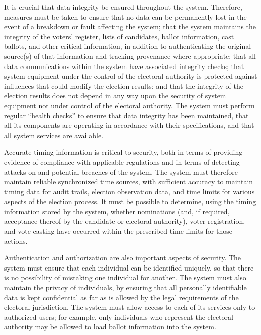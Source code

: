 It is crucial that data integrity be ensured throughout the
system. Therefore, measures must be taken to ensure that no data can
be permanently lost in the event of a breakdown or fault affecting the
system; that the system maintains the integrity of the voters'
register, lists of candidates, ballot information, cast ballots, and
other critical information, in addition to authenticating the original
source(s) of that information and tracking provenance where
appropriate; that all data communications within the system have
associated integrity checks; that system equipment under the control
of the electoral authority is protected against influences that could
modify the election results; and that the integrity of the election
results does not depend in any way upon the security of system
equipment not under control of the electoral authority. The system
must perform regular ``health checks'' to ensure that data integrity
has been maintained, that all its components are operating in
accordance with their specifications, and that all system services are
available.

Accurate timing information is critical to security, both in terms of
providing evidence of compliance with applicable regulations and in
terms of detecting attacks on and potential breaches of the
system. The system must therefore maintain reliable synchronized time
sources, with sufficient accuracy to maintain timing data for audit
trails, election observation data, and time limits for various aspects
of the election process. It must be possible to determine, using the
timing information stored by the system, whether nominations (and, if
required, acceptance thereof by the candidate or electoral authority),
voter registration, and vote casting have occurred within the
prescribed time limits for those actions.

Authentication and authorization are also important aspects of
security. The system must ensure that each individual can be
identified uniquely, so that there is no possibility of mistaking one
individual for another. The system must also maintain the privacy of
individuals, by ensuring that all personally identifiable data is kept
confidential as far as is allowed by the legal requirements of the
electoral jurisdiction. The system must allow access to each of its
services only to authorized users; for example, only individuals who
represent the electoral authority may be allowed to load ballot
information into the system.

